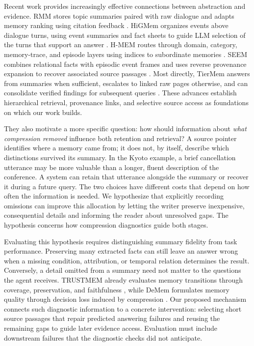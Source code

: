 \documentclass{article}
\begin{document}
Recent work provides increasingly effective connections between abstraction and
evidence. RMM stores topic summaries paired with raw dialogue and adapts memory
ranking using citation feedback \citep{rmm}. HiGMem organizes events above
dialogue turns, using event summaries and fact sheets to guide LLM selection of
the turns that support an answer \citep{higmem}. H-MEM routes through domain,
category, memory-trace, and episode layers using indices to subordinate memories
\citep{hmem}. SEEM combines relational facts with episodic event frames and
uses reverse provenance expansion to recover associated source passages
\citep{seem}. Most directly, TierMem answers from summaries when sufficient,
escalates to linked raw pages otherwise, and can consolidate verified findings
for subsequent queries \citep{tiermem}. These advances establish hierarchical
retrieval, provenance links, and selective source access as foundations on which
our work builds.

They also motivate a more specific question: how should information about
\emph{what compression removed} influence both retention and retrieval? A source
pointer identifies where a memory came from; it does not, by itself, describe
which distinctions survived its summary. In the Kyoto example, a brief
cancellation utterance may be more valuable than a longer, fluent description
of the conference. A system can retain that utterance alongside the summary or
recover it during a future query. The two choices have different costs that
depend on how often the information is needed. We hypothesize that explicitly
recording omissions can improve this allocation by letting the writer preserve
inexpensive, consequential details and informing the reader about unresolved
gaps. The hypothesis concerns how compression diagnostics guide both stages.

Evaluating this hypothesis requires distinguishing summary fidelity from task
performance. Preserving many extracted facts can still leave an answer wrong
when a missing condition, attribution, or temporal relation determines the
result. Conversely, a detail omitted from a summary need not matter to the
questions the agent receives. TRUSTMEM already evaluates memory transitions
through coverage, preservation, and faithfulness \citep{trustmem}, while DeMem
formulates memory quality through decision loss induced by compression
\citep{demem}. Our proposed mechanism connects such diagnostic information to a
concrete intervention: selecting short source passages that repair predicted
answering failures and reusing the remaining gaps to guide later evidence access.
Evaluation must include downstream failures that the diagnostic checks did not
anticipate.
\end{document}
